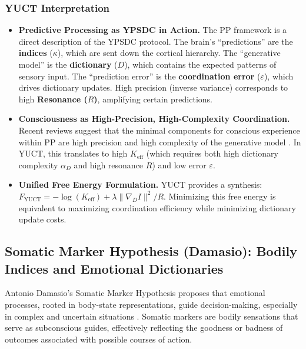 \documentclass[12pt,a4paper]{article}
\begin{document}
	\subsubsection*{YUCT Interpretation}
	\begin{itemize}
		\item \textbf{Predictive Processing as YPSDC in Action.} The PP framework is a direct description of the YPSDC protocol. The brain's ``predictions'' are the \textbf{indices} (\(\kappa\)), which are sent down the cortical hierarchy. The ``generative model'' is the \textbf{dictionary} (\(D\)), which contains the expected patterns of sensory input. The ``prediction error'' is the \textbf{coordination error} (\(\varepsilon\)), which drives dictionary updates. High precision (inverse variance) corresponds to high \textbf{Resonance (\(R\))}, amplifying certain predictions.
		\item \textbf{Consciousness as High-Precision, High-Complexity Coordination.} Recent reviews suggest that the minimal components for conscious experience within PP are high precision and high complexity of the generative model \cite{Wiese2017}. In YUCT, this translates to high \(K_{\mathrm{eff}}\) (which requires both high dictionary complexity \(\alpha_D\) and high resonance \(R\)) and low error \(\varepsilon\).
		\item \textbf{Unified Free Energy Formulation.} YUCT provides a synthesis: \(F_{\mathrm{YUCT}} = -\log(K_{\mathrm{eff}}) + \lambda \|\nabla_D I\|^2 / R\). Minimizing this free energy is equivalent to maximizing coordination efficiency while minimizing dictionary update costs.
	\end{itemize}
	
	\subsection{Somatic Marker Hypothesis (Damasio): Bodily Indices and Emotional Dictionaries}
	
	Antonio Damasio's Somatic Marker Hypothesis proposes that emotional processes, rooted in body-state representations, guide decision-making, especially in complex and uncertain situations \cite{Damasio1994}. Somatic markers are bodily sensations that serve as subconscious guides, effectively reflecting the goodness or badness of outcomes associated with possible courses of action.
	
\end{document}
